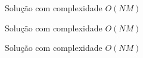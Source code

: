 \begin{frame}[fragile]{Solução com complexidade $O(NM)$}
\end{frame}

\begin{frame}[fragile]{Solução com complexidade $O(NM)$}
\end{frame}

\begin{frame}[fragile]{Solução com complexidade $O(NM)$}
\end{frame}
